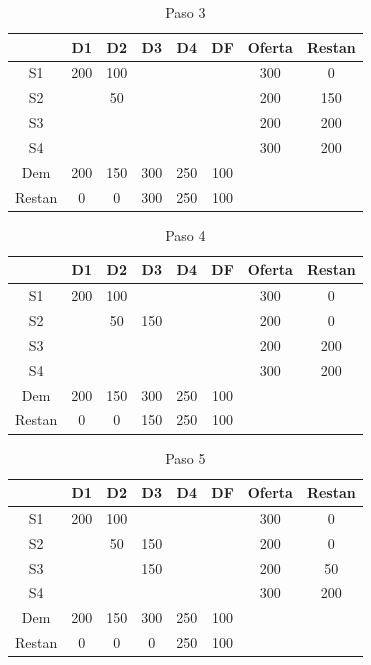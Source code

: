 \documentclass[12pt]{article}  %
\begin{document}
\begin{table}[H]
\centering
\caption{Paso 3}
\label{tab:paso3Prob4}
\begin{tabular}{c|ccccc|cc}
& D1 & D2 & D3 & D4 & DF & Oferta & Restan \\
\hline
S1 & 200 & 100 & & & & 300 & 0 \\
S2 & & \cellcolor{yellow}50 & & & & 200 & 150 \\
S3 & & & & & & 200 & 200 \\
S4 & & & & & & 300 & 200 \\
\hline
Dem & 200 & 150 & 300 & 250 & 100 & & \\
Restan & 0 & 0 & 300 & 250 & 100 & & 
\end{tabular}
\end{table}

\begin{table}[H]
\centering
\caption{Paso 4}
\label{tab:paso4Prob4}
\begin{tabular}{c|ccccc|cc}
& D1 & D2 & D3 & D4 & DF & Oferta & Restan \\
\hline
S1 & 200 & 100 & & & & 300 & 0 \\
S2 & & 50 & \cellcolor{yellow}150 & & & 200 & 0 \\
S3 & & & & & & 200 & 200 \\
S4 & & & & & & 300 & 200 \\
\hline
Dem & 200 & 150 & 300 & 250 & 100 & & \\
Restan & 0 & 0 & 150 & 250 & 100 & & 
\end{tabular}
\end{table}

\begin{table}[H]
\centering
\caption{Paso 5}
\label{tab:paso5Prob4}
\begin{tabular}{c|ccccc|cc}
& D1 & D2 & D3 & D4 & DF & Oferta & Restan \\
\hline
S1 & 200 & 100 & & & & 300 & 0 \\
S2 & & 50 & 150 & & & 200 & 0 \\
S3 & & & \cellcolor{yellow}150 & & & 200 & 50 \\
S4 & & & & & & 300 & 200 \\
\hline
Dem & 200 & 150 & 300 & 250 & 100 & & \\
Restan & 0 & 0 & 0 & 250 & 100 & & 
\end{tabular}
\end{table}
\end{document}
